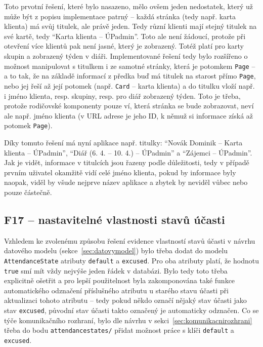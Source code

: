 Toto prvotní řešení, které bylo nasazeno, mělo ovšem jeden nedostatek, který už může být z popisu implementace patrný -- každá stránka (tedy např. karta klienta) má svůj titulek, ale právě jeden. Tedy různí klienti mají stejný titulek na své kartě, tedy \enquote{Karta klienta -- ÚPadmin}. Toto ale není žádoucí, protože při otevření více klientů pak není jasné, který je zobrazený. Totéž platí pro karty skupin a zobrazený týden v diáři. Implementované řešení tedy bylo rozšířeno o možnost manipulovat s titulkem i ze samotné stránky, která je potomkem \verb|Page| -- a to tak, že na základě informací z předka buď má titulek na starost přímo \verb|Page|, nebo jej řeší až její potomek (např. \verb|Card| -- karta klienta) a do titulku vloží např. i jméno klienta, resp. skupiny, resp. pro diář zobrazený týden. Toto je třeba, protože rodičovské komponenty pouze ví, která stránka se bude zobrazovat, neví ale např. jméno klienta (v URL adrese je jeho ID, k němuž si informace získá až potomek \verb|Page|).

Díky tomuto řešení má nyní aplikace např. titulky: \enquote{Novák Dominik – Karta klienta – ÚPadmin}, \enquote{Diář (6. 4. – 10. 4.) – ÚPadmin} a \enquote{Zájemci – ÚPadmin}. Jak je vidět, informace v titulcích jsou řazeny podle důležitosti, tedy v případě prvním uživatel okamžitě vidí celé jméno klienta, pokud by informace byly naopak, viděl by všude nejprve název aplikace a zbytek by neviděl vůbec nebo pouze částečně.

\subsection{F17 -- nastavitelné vlastnosti stavů účasti}

Vzhledem ke zvolenému způsobu řešení evidence vlastností stavů účasti v návrhu datového modelu (sekce~\ref{sec:datovymodel}) bylo třeba dodat do modelu \verb|AttendanceState| atributy \verb|default| a \verb|excused|. Pro oba atributy platí, že hodnotu \verb|true| smí mít vždy nejvýše jeden řádek v databázi. Bylo tedy toto třeba explicitně ošetřit a pro lepší použitelnost byla zakomponována také funkce automatického odznačení příslušného atributu u starého stavu účasti při aktualizaci tohoto atributu -- tedy pokud někdo označí nějaký stav účasti jako stav \verb|excused|, původní stav účasti takto označený je automaticky odznačen. Co se týče komunikačního rozhraní, bylo dle návrhu v sekci~\ref{sec:komunikacnirozhrani} třeba do bodu \verb|attendancestates/| přidat možnost práce s klíči \verb|default| a \verb|excused|.

